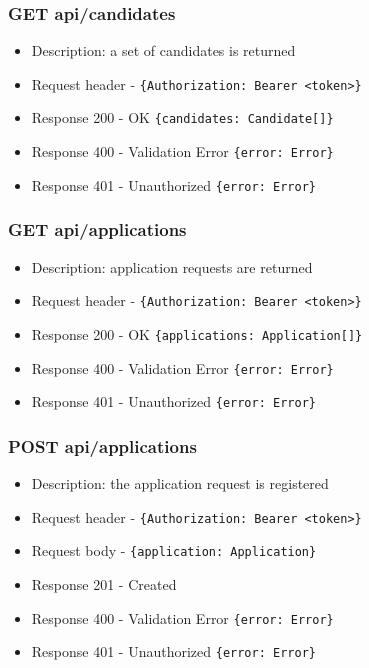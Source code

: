 \subsubsection{GET api/candidates}
\begin{itemize}
    \item Description: a set of candidates is returned
    \item Request header - \verb|{Authorization: Bearer <token>}|
    \item Response 200 - OK \verb|{candidates: Candidate[]}|
    \item Response 400 - Validation Error \verb|{error: Error}|
    \item Response 401 - Unauthorized \verb|{error: Error}|
\end{itemize}

\subsubsection{GET api/applications}
\begin{itemize}
    \item Description: application requests are returned
    \item Request header - \verb|{Authorization: Bearer <token>}|
    \item Response 200 - OK \verb|{applications: Application[]}|
    \item Response 400 - Validation Error \verb|{error: Error}|
    \item Response 401 - Unauthorized \verb|{error: Error}|
\end{itemize}

\subsubsection{POST api/applications}
\begin{itemize}
    \item Description: the application request is registered
    \item Request header - \verb|{Authorization: Bearer <token>}|
    \item Request body - \verb|{application: Application}|
    \item Response 201 - Created
    \item Response 400 - Validation Error \verb|{error: Error}|
    \item Response 401 - Unauthorized \verb|{error: Error}|
\end{itemize}

